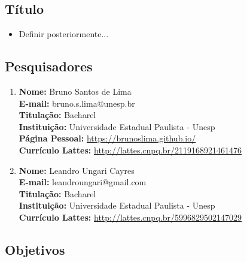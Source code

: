 \documentclass[a4paper,12pt,onecolumn,titlepage]{article}
\begin{document}
\subsection{Título}
\label{subsec:titulo}

\begin{itemize}

\item Definir posteriormente...


\end{itemize}

\subsection{Pesquisadores}
\label{subsec:pesquisadores}

\begin{enumerate}
\item \textbf{Nome:} Bruno Santos de Lima\\
	  \textbf{E-mail:} bruno.s.lima@unesp.br\\
	  \textbf{Titulação:} Bacharel\\
	  \textbf{Instituição:} Universidade Estadual Paulista - Unesp\\
	  \textbf{Página Pessoal:} \url{https://brunoslima.github.io/}\\
	  \textbf{Currículo Lattes:} \url{http://lattes.cnpq.br/2119168921461476}
	  
\item \textbf{Nome:} Leandro Ungari Cayres\\
	  \textbf{E-mail:} leandroungari@gmail.com\\
	  \textbf{Titulação:} Bacharel\\
	  \textbf{Instituição:} Universidade Estadual Paulista - Unesp\\
	  \textbf{Currículo Lattes:} \url{http://lattes.cnpq.br/5996829502147029}

\end{enumerate}

\subsection{Objetivos}
\label{subsec:objetivos}
\end{document}
